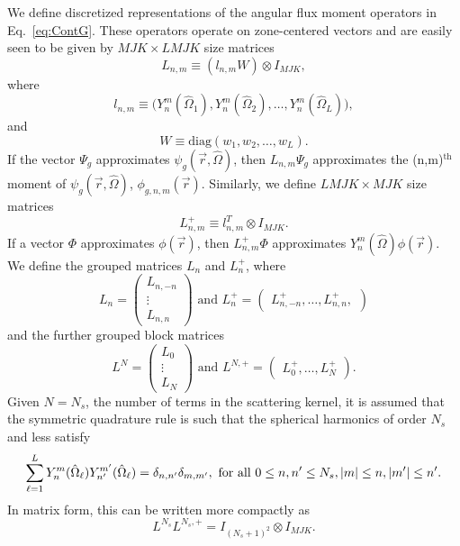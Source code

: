 We define discretized representations of the angular flux moment operators in Eq.~\ref{eq:ContG}. These operators operate on zone-centered vectors and are easily seen to be given by $MJK \times LMJK$ size matrices
\begin{equation}
	L_{n,m} \equiv (l_{n,m}W) \otimes I_{MJK},
\end{equation}
where
\begin{equation}
	l_{n,m} \equiv \big (Y_{n}^{m}(\hat{\Omega}_{1}), Y_{n}^{m}(\hat{\Omega}_{2}), \dots, Y_{n}^{m}(\hat{\Omega}_{L}) \big ),
\end{equation}
and
\begin{equation}
	W \equiv \text{diag}(w_{1}, w_{2}, \dots, w_{L}).
\end{equation}
If the vector $\Psi_{g}$ approximates $\psi_{g}(\vec{r}, \hat{\Omega})$, then $L_{n,m} \Psi_{g}$ approximates the (n,m)$^{\text{th}}$ moment of $\psi_{g}(\vec{r},\hat{\Omega})$, $\phi_{g,n,m}(\vec{r})$. Similarly, we define $LMJK \times MJK$ size matrices
\begin{equation}
	L^{+}_{n,m} \equiv l^{T}_{n,m} \otimes I_{MJK}.
\end{equation} 
If a vector $\Phi$ approximates $\phi(\vec{r})$, then $L^{+}_{n,m} \Phi$ approximates $Y_{n}^{m}(\hat{\Omega}) \phi(\vec{r})$. We define the grouped matrices $L_{n}$ and $L^{+}_{n}$, where
\begin{equation}
	L_{n} = \begin{pmatrix}
			L_{n,-n} \\
			\vdots \\
			L_{n,n}
		    \end{pmatrix} \text{ and }
	L^{+}_{n} = \begin{pmatrix}
		    	L^{+}_{n,-n}, \dots, L^{+}_{n,n},
		    \end{pmatrix}
\end{equation}
and the further grouped block matrices
\begin{equation}
	L^{N} = \begin{pmatrix}
			L_{0} \\
			\vdots \\
			L_{N}
		    \end{pmatrix} \text{ and }
	L^{N,+} = \begin{pmatrix}
				L^{+}_{0}, \dots, L^{+}_{N}
			\end{pmatrix}.
\end{equation}
Given $N = N_{s}$, the number of terms in the scattering kernel, it is assumed that the symmetric quadrature rule is such that the spherical harmonics of order $N_{s}$ and less satisfy
\begin{equation}
	\sum_{\ell = 1}^{L} Y_{n}^{m}(\hat{\Omega}_{\ell}) Y_{n'}^{m'}(\hat{\Omega}_{\ell}) = \delta_{n,n'} \delta_{m,m'}, \text{ for all } 0 \leq n, n' \leq N_{s}, \lvert m\rvert \leq n, \lvert m'\rvert \leq n'.
\end{equation}
In matrix form, this can be written more compactly as
\begin{equation}
	L^{N_{s}} L^{N_{s},+} = I_{(N_{s}+1)^{2}} \otimes I_{MJK}.
\end{equation}

